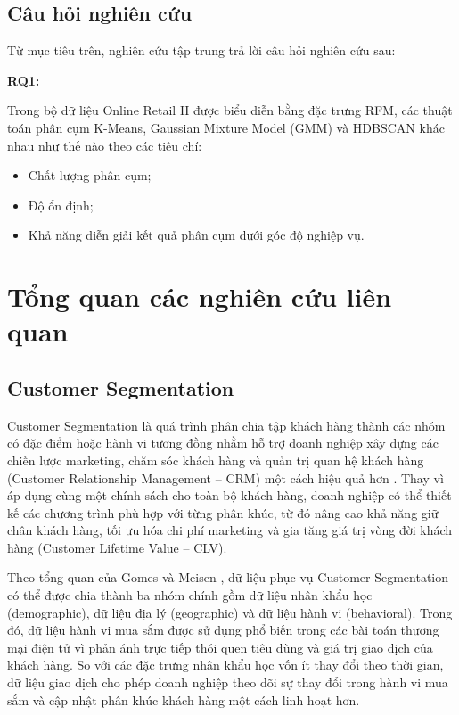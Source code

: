 \documentclass[12pt]{ai_conquer2026}
\begin{document}
\subsection{Câu hỏi nghiên cứu}

Từ mục tiêu trên, nghiên cứu tập trung trả lời câu hỏi nghiên cứu sau:

\textbf{RQ1:}

Trong bộ dữ liệu Online Retail II được biểu diễn bằng đặc trưng RFM, các thuật toán phân cụm K-Means, Gaussian Mixture Model (GMM) và HDBSCAN khác nhau như thế nào theo các tiêu chí:

\begin{itemize}
    \item Chất lượng phân cụm;
    \item Độ ổn định;
    \item Khả năng diễn giải kết quả phân cụm dưới góc độ nghiệp vụ.
\end{itemize}

\section{Tổng quan các nghiên cứu liên quan}

\subsection{Customer Segmentation}

Customer Segmentation là quá trình phân chia tập khách hàng thành các nhóm có đặc điểm hoặc hành vi tương đồng nhằm hỗ trợ doanh nghiệp xây dựng các chiến lược marketing, chăm sóc khách hàng và quản trị quan hệ khách hàng (Customer Relationship Management -- CRM) một cách hiệu quả hơn \cite{Sari2016,Gomes2023}. Thay vì áp dụng cùng một chính sách cho toàn bộ khách hàng, doanh nghiệp có thể thiết kế các chương trình phù hợp với từng phân khúc, từ đó nâng cao khả năng giữ chân khách hàng, tối ưu hóa chi phí marketing và gia tăng giá trị vòng đời khách hàng (Customer Lifetime Value -- CLV).

Theo tổng quan của Gomes và Meisen \cite{Gomes2023}, dữ liệu phục vụ Customer Segmentation có thể được chia thành ba nhóm chính gồm dữ liệu nhân khẩu học (demographic), dữ liệu địa lý (geographic) và dữ liệu hành vi (behavioral). Trong đó, dữ liệu hành vi mua sắm được sử dụng phổ biến trong các bài toán thương mại điện tử vì phản ánh trực tiếp thói quen tiêu dùng và giá trị giao dịch của khách hàng. So với các đặc trưng nhân khẩu học vốn ít thay đổi theo thời gian, dữ liệu giao dịch cho phép doanh nghiệp theo dõi sự thay đổi trong hành vi mua sắm và cập nhật phân khúc khách hàng một cách linh hoạt hơn.
\end{document}
